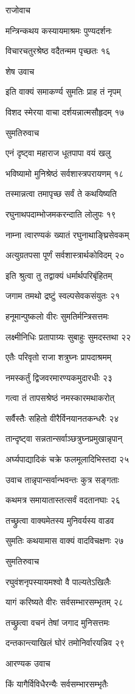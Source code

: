 राजोवाच

मन्त्रिन्कथय कस्यायमाश्रमः पुण्यदर्शनः

विचारचतुरश्रेष्ठ वदैतन्मम पृच्छतः १६

शेष उवाच

इति वाक्यं समाकर्ण्य सुमतिः प्राह तं नृपम्

विशद स्मेरया वाचा दर्शयन्नात्मसौहृदम् १७

सुमतिरुवाच

एनं दृष्ट्वा महाराज धूतपापा वयं खलु

भविष्यामो मुनिश्रेष्ठं सर्वशास्त्रपरायणम् १८

तस्मान्नत्वा तमापृच्छ सर्वं ते कथयिष्यति

रघुनाथपदाम्भोजमकरन्दाति लोलुपः १९

नाम्ना त्वारण्यकं ख्यातं रघुनाथाङ्घ्रिसेवकम्

अत्युग्रतपसा पूर्णं सर्वशास्त्रार्थकोविदम् २०

इति श्रुत्वा तु तद्वाक्यं धर्मार्थपरिबृंहितम्

जगाम तमथो द्रष्टुं स्वल्पसेवकसंयुतः २१

हनूमान्पुष्कलो वीरः सुमतिर्मन्त्रिसत्तमः

लक्ष्मीनिधिः प्रतापाग्र्यः सुबाहुः सुमदस्तथा २२

एतैः परिवृतो राजा शत्रुघ्नः प्रापदाश्रमम्

नमस्कर्तुं द्विजवरमारण्यकमुदारधीः २३

गत्वा तं तापसश्रेष्ठं नमस्कारमथाकरोत्

सर्वैस्तैः सहितो वीरैर्विनयानतकन्धरैः २४

तान्दृष्ट्वा सन्नतान्सर्वाञ्छत्रुघ्नप्रमुखान्नृपान्

अर्घ्यपाद्यादिकं चक्रे फलमूलादिभिस्तदा २५

उवाच तान्नृपान्सर्वान्भवन्तः कुत्र सङ्गताः

कथमत्र समायातास्तत्सर्वं वदतानघाः २६

तच्छ्रुत्वा वाक्यमेतस्य मुनिवर्यस्य वाडव

सुमतिः कथयामास वाक्यं वादविचक्षणः २७

सुमतिरुवाच

रघुवंशनृपस्यायमश्वो वै पाल्यतेऽखिलैः

यागं करिष्यते वीरः सर्वसम्भारसम्भृतम् २८

तच्छ्रुत्वा वचनं तेषां जगाद मुनिसत्तमः

दन्तकान्त्याखिलं घोरं तमोनिर्वारयन्निव २९

आरण्यक उवाच

किं यागैर्विविधैरन्यैः सर्वसम्भारसम्भृतैः

